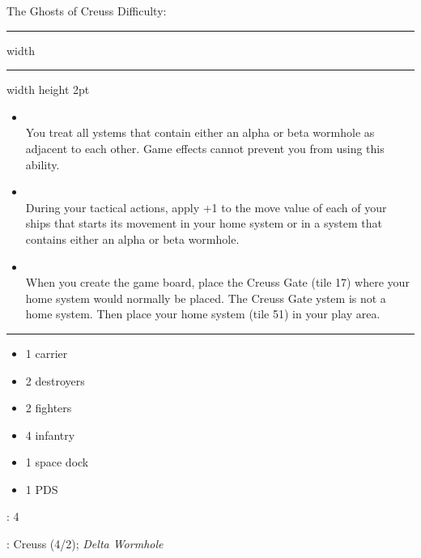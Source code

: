 \newpage
{\handel\Huge The Ghosts of Creuss} \hfill {\Large Difficulty: \hard} \vspace{-4pt}\\
\hrule width \hsize \kern 1mm \hrule width \hsize height 2pt


\begin{multicols}{2}


\begin{itemize}
\item {}\\
You treat all ystems that contain either an alpha or beta wormhole as adjacent to each other. Game effects cannot prevent you from using this ability.
\item {}\\
During your tactical actions, apply +1 to the move value of each of your ships that starts its movement in your home system or in a system that contains either an alpha or beta wormhole.
\item {}\\
When you create the game board, place the Creuss Gate (tile 17) where your home system would normally be placed. The Creuss Gate ystem is not a home system. Then place your home system (tile 51) in your play area.
\end{itemize}


\vspace{-10pt}\rule{\hsize}{0.4pt}\vspace{5pt}


\vspace{-5pt}
\begin{multicols}{2}
\begin{itemize}
\item 1 carrier
\item 2 destroyers
\item 2 fighters
\item 4 infantry
\item 1 space dock
\color{white}
\item 1 PDS
\color{black}
\end{itemize}
\end{multicols}

\vspace{-5pt}
: 4

\vspace{2pt}
: Creuss (4/2); \emph{Delta Wormhole}


\end{multicols}
